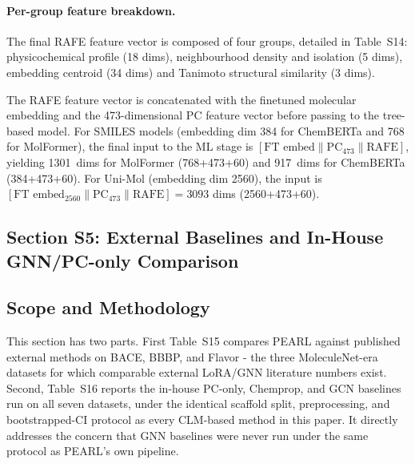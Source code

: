 \documentclass[9pt,a4paper]{article}
\begin{document}
\paragraph{Per-group feature breakdown.}
The final RAFE feature vector is composed of four groups, detailed in Table~S14: physicochemical profile (18 dims), neighbourhood density and isolation (5 dims), embedding centroid (34 dims) and Tanimoto structural similarity (3 dims).

The RAFE feature vector is concatenated with the finetuned molecular embedding and the 473-dimensional PC feature vector before passing to the tree-based model.
For SMILES models (embedding dim 384 for ChemBERTa and 768 for MolFormer), the final input to the ML stage is
$[\text{FT embed} \| \text{PC}_{473} \| \text{RAFE}]$, yielding 1301~dims for
MolFormer (768+473+60) and 917~dims for ChemBERTa (384+473+60).
For Uni-Mol (embedding dim 2560), the input is
$[\text{FT embed}_{2560} \| \text{PC}_{473} \| \text{RAFE}] = 3093$ dims (2560+473+60).

\subsection*{Section S5: External Baselines and In-House GNN/PC-only Comparison}

\subsection*{Scope and Methodology}

This section has two parts. First Table~S15
compares PEARL against published external methods on BACE, BBBP, and Flavor - the
three MoleculeNet-era datasets for which comparable external LoRA/GNN literature
numbers exist. Second, Table~S16 reports the
in-house PC-only, Chemprop, and GCN baselines run on all seven datasets, under
the identical scaffold split, preprocessing, and bootstrapped-CI protocol as every
CLM-based method in this paper. It directly addresses the concern that GNN baselines were never run
under the same protocol as PEARL's own pipeline.

\end{document}
